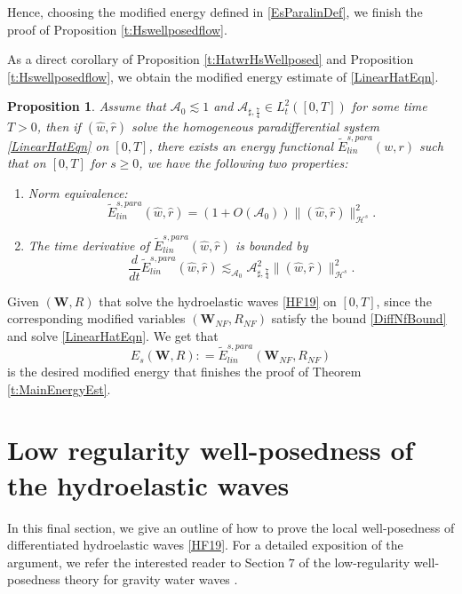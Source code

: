 \documentclass[10pt]{amsart}
\newtheorem{proposition}[theorem]{Proposition}
\theoremstyle{remark}
\theoremstyle{definition}
\numberwithin{equation}{section}
\renewcommand{\H}{{\mathcal H }}
\newcommand{\f}{\frac}
\newcommand{\bw}{\mathbf{W}}
\newcommand{\CalAZ}{{\mathcal{A}_0}}
\newcommand{\ASSharp}{{\mathcal{A}_{\sharp,\frac{7}{4}}^2}}
\begin{document}
Hence, choosing the modified energy  defined in \eqref{EsParalinDef}, we finish the proof of Proposition \ref{t:Hswellposedflow}.

As a direct corollary of Proposition \ref{t:HatwrHsWellposed} and Proposition \ref{t:Hswellposedflow}, we obtain the modified energy estimate of \eqref{LinearHatEqn}.

\begin{proposition} 
Assume that $\mathcal{A}_0
\lesssim 1$ and $\mathcal{A}_{\sharp,\f74}  \in L^2_t([0,T])$ for some time $T>0$, then if $(\hat{w},\hat{r})$ solve the homogeneous paradifferential system \eqref{LinearHatEqn} on $[0,T]$, there exists an  energy functional $\tilde{E}^{s,para}_{lin}(w, r)$ such that on $[0,T]$ for $s\geq 0$, we have the following two properties:
\begin{enumerate}
\item Norm equivalence:
\begin{equation*}
    \tilde{E}^{s,para}_{lin}(\hat{w},\hat{r}) = (1+O(\CalAZ)) \|(\hat{w},\hat{r})\|_{\H^s}^2.
\end{equation*}
\item The time derivative of $\tilde{E}^{s,para}_{lin}(\hat{w},\hat{r})$ is bounded by
\begin{equation*}
    \frac{d}{dt}  \tilde{E}^{s,para}_{lin}(\hat{w},\hat{r}) \lesssim_{\CalAZ} \ASSharp \|(\hat{w},\hat{r})\|_{\H^s}^2.
\end{equation*}
\end{enumerate}  
\end{proposition}
Given $(\bw, R)$ that solve the hydroelastic waves \eqref{HF19} on $[0,T]$, since the corresponding modified variables $(\bw_{NF}, R_{NF})$  satisfy  the bound \eqref{DiffNfBound} and solve \eqref{LinearHatEqn}.
We get that 
\begin{equation*}
    E_s(\bw, R): = \tilde{E}^{s,para}_{lin}(\bw_{NF}, R_{NF})
\end{equation*}
is the desired modified energy that finishes the proof of Theorem \ref{t:MainEnergyEst}.


\section{Low regularity well-posedness of the hydroelastic waves} \label{s:LowWellPosed}
In this final section, we give an outline of how to prove the local well-posedness of differentiated hydroelastic waves \eqref{HF19}.
For a detailed exposition of the argument, we refer the interested reader to Section $7$ of the low-regularity well-posedness theory for gravity water waves  \cite{AIT}.
\end{document}
